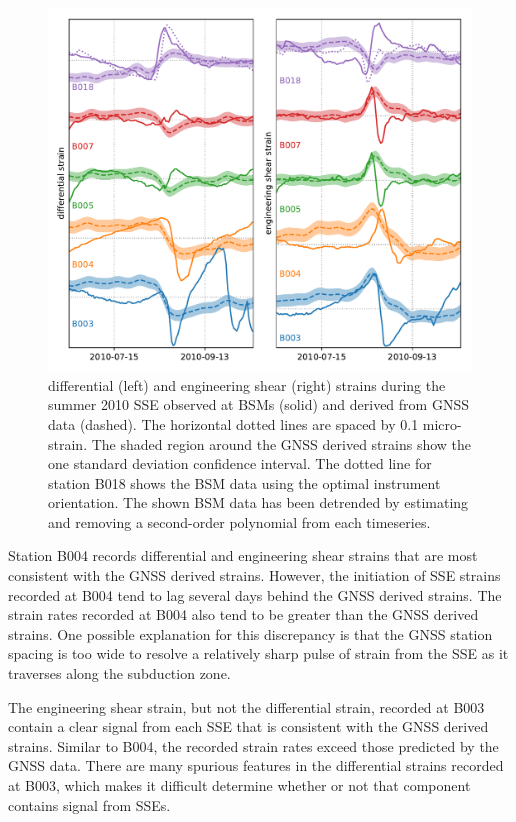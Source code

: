 \documentclass[10pt,a4paper]{article}
\begin{document}
\begin{figure}
\includegraphics{figures/SSE1.pdf}
\caption{differential (left) and engineering shear (right) strains during the summer 2010 SSE observed at BSMs (solid) and derived from GNSS data (dashed). The horizontal dotted lines are spaced by 0.1 micro-strain. The shaded region around the GNSS derived strains show the one standard deviation confidence interval. The dotted line for station B018 shows the BSM data using the optimal instrument orientation. The shown BSM data has been detrended by estimating and removing a second-order polynomial from each timeseries.}   
\label{fig:SSE1}
\end{figure}

Station B004 records differential and engineering shear strains that are most consistent with the GNSS derived strains. However, the initiation of SSE strains recorded at B004 tend to lag several days behind the GNSS derived strains. The strain rates recorded at B004 also tend to be greater than the GNSS derived strains. One possible explanation for this discrepancy is that the GNSS station spacing is too wide to resolve a relatively sharp pulse of strain from the SSE as it traverses along the subduction zone. 

The engineering shear strain, but not the differential strain, recorded at B003 contain a clear signal from each SSE that is consistent with the GNSS derived strains. Similar to B004, the recorded strain rates exceed those predicted by the GNSS data. There are many spurious features in the differential strains recorded at B003, which makes it difficult determine whether or not that component contains signal from SSEs. 
\end{document}
